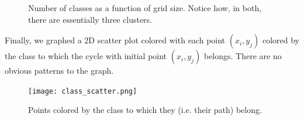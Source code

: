 \documentclass{article}
\begin{document}
\begin{figure}[h!]

\caption{Number of classes as a function of grid size. Notice how, in both, there are essentially three clusters.}
\end{figure}

Finally, we graphed a 2D scatter plot colored with each point $(x_i, y_j)$ colored by the class to which the cycle with initial point $(x_i, y_j)$ belongs. There are no obvious patterns to the graph.

\begin{figure}[h!]
\center
\texttt{[image: class\_scatter.png]}
\caption{Points colored by the class to which they (i.e. their path) belong.}
\end{figure}
\end{document}
